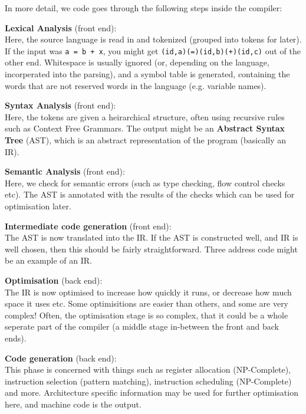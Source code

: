 In more detail, we code goes through the following steps inside the compiler:

\begin{description}
  \item \textbf{Lexical Analysis} (front end):\\
  Here, the source language is read in and tokenized (grouped into tokens for 
  later). If the input was \texttt{a = b + x}, you might get
  \texttt{(id,a)(=)(id,b)(+)(id,c)} out of the other end. Whitespace is usually
  ignored (or, depending on the language, incorperated into the parsing), and
  a symbol table is generated, containing the words that are not reserved words
  in the language (e.g. variable names).

  \item \textbf{Syntax Analysis} (front end):\\
  Here, the tokens are given a heirarchical structure, often using recursive
  rules such as Context Free Grammars. The output might be an \textbf{Abstract
  Syntax Tree} (AST), which is an abstract representation of the program
  (basically an IR).

  \item \textbf{Semantic Analysis} (front end):\\
  Here, we check for semantic errors (such as type checking, flow control
  checks etc). The AST is annotated with the results of the checks which can be
  used for optimisation later.

  \item \textbf{Intermediate code generation} (front end):\\
  The AST is now translated into the IR. If the AST is constructed well, and IR
  is well chosen, then this should be fairly straightforward. Three address code
  might be an example of an IR.

  \item \textbf{Optimisation} (back end):\\
  The IR is now optimised to increase how quickly it runs, or decrease how much
  space it uses etc. Some optimisitions are easier than others, and some are
  very complex! Often, the optimisation stage is so complex, that it could be
  a whole seperate part of the compiler (a middle stage in-between the front and
  back ends).

  \item \textbf{Code generation} (back end):\\
  This phase is concerned with things such as register allocation (NP-Complete),
  instruction selection (pattern matching), instruction scheduling (NP-Complete)
  and more. Architecture specific information may be used for further
  optimisation here, and machine code is the output.
\end{description}
